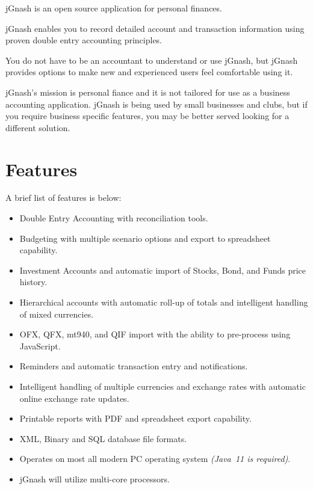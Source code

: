 \documentclass[letterpaper,12pt]{book}
\begin{document}
    jGnash is an open source application for personal finances.

    jGnash enables you to record detailed account and transaction information using proven double entry accounting principles.

    You do not have to be an accountant to understand or use jGnash, but jGnash provides options to make new and
    experienced users feel comfortable using it.

    jGnash's mission is personal fiance and it is not tailored for use as a business accounting application.
    jGnash is being used by small businesses and clubs, but if you require business specific features, you may be
    better served looking for a different solution.

    \section{Features}\label{sec:features}
    A brief list of features is below:

    \begin{itemize}
        \item Double Entry Accounting with reconciliation tools.
        \item Budgeting with multiple scenario options and export to spreadsheet capability.
        \item Investment Accounts and automatic import of Stocks, Bond, and Funds price history.
        \item Hierarchical accounts with automatic roll-up of totals and intelligent handling of mixed currencies.
        \item OFX, QFX, mt940, and QIF import with the ability to pre-process using JavaScript.
        \item Reminders and automatic transaction entry and notifications.
        \item Intelligent handling of multiple currencies and exchange rates with automatic online exchange rate updates.
        \item Printable reports with PDF and spreadsheet export capability.
        \item XML, Binary and SQL database file formats.
        \item Operates on most all modern PC operating system \textit{(Java\texttrademark~11 is required)}.
        \item jGnash will utilize multi-core processors.
    \end{itemize}
    
\end{document}
